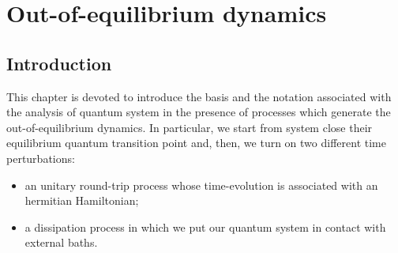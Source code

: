 \chapter{Out-of-equilibrium dynamics}
\label{chp_out}

%
\section{Introduction}

This chapter is devoted to introduce the basis and the notation associated with the analysis
of quantum system in the presence of processes which generate the out-of-equilibrium 
dynamics. In particular, we start from system close their equilibrium quantum transition
point and, then, we turn on two different time perturbations:
\begin{itemize}
	\item
		an unitary round-trip process whose time-evolution is associated with
		an hermitian Hamiltonian;
	\item
		a dissipation process in which we put our quantum system in contact with
		external baths.
\end{itemize}











